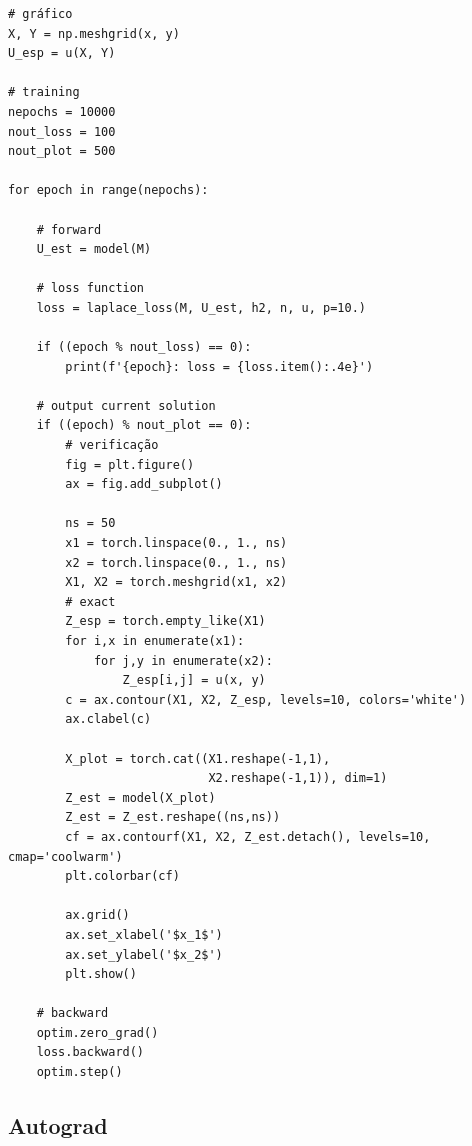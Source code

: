 \begin{lstlisting}[caption=mlp\_eqlaplace\_df.py, label=cap_mlp_sec_modelo:cod:mlp_eqlaplace_df]
# gráfico
X, Y = np.meshgrid(x, y)
U_esp = u(X, Y)

# training
nepochs = 10000
nout_loss = 100
nout_plot = 500

for epoch in range(nepochs):

    # forward
    U_est = model(M)

    # loss function
    loss = laplace_loss(M, U_est, h2, n, u, p=10.)

    if ((epoch % nout_loss) == 0):
        print(f'{epoch}: loss = {loss.item():.4e}')
    
    # output current solution
    if ((epoch) % nout_plot == 0):
        # verificação
        fig = plt.figure()
        ax = fig.add_subplot()

        ns = 50
        x1 = torch.linspace(0., 1., ns)
        x2 = torch.linspace(0., 1., ns)
        X1, X2 = torch.meshgrid(x1, x2)
        # exact
        Z_esp = torch.empty_like(X1)
        for i,x in enumerate(x1):
            for j,y in enumerate(x2):
                Z_esp[i,j] = u(x, y)
        c = ax.contour(X1, X2, Z_esp, levels=10, colors='white')
        ax.clabel(c)

        X_plot = torch.cat((X1.reshape(-1,1),
                            X2.reshape(-1,1)), dim=1)
        Z_est = model(X_plot)
        Z_est = Z_est.reshape((ns,ns))
        cf = ax.contourf(X1, X2, Z_est.detach(), levels=10, cmap='coolwarm')
        plt.colorbar(cf)
        
        ax.grid()
        ax.set_xlabel('$x_1$')
        ax.set_ylabel('$x_2$')
        plt.show()        

    # backward
    optim.zero_grad()
    loss.backward()
    optim.step()
\end{lstlisting}

\subsection{Autograd}

